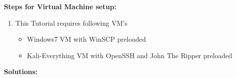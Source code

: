 \documentclass[12pt]{article}
\newcommand{\ben}{\begin{enumerate}}
\newcommand{\een}{\end{enumerate}}
\begin{document}
\textbf{Steps for Virtual Machine setup:}

\ben
\item This Tutorial requires following VM's
\begin{itemize}
	\item Windows7 VM with WinSCP preloaded
	\item Kali-Everything VM with OpenSSH and John The Ripper preloaded
	
\end{itemize}
\een

\pagebreak



\textbf{Solutions:}
\end{document}
